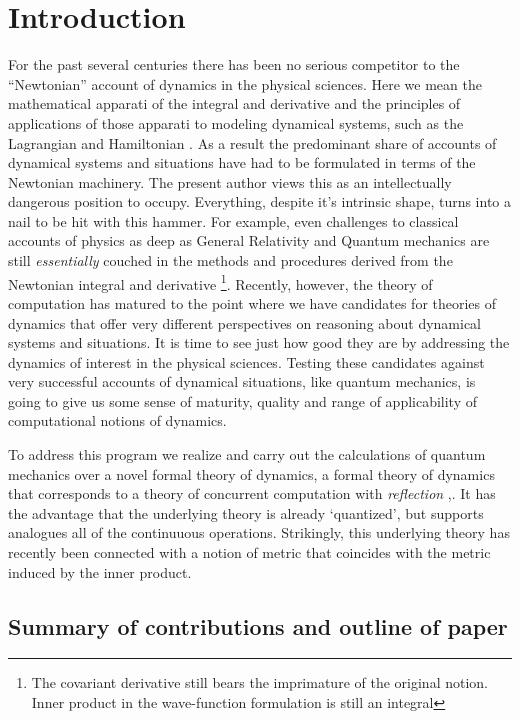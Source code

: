 \section{Introduction}\label{sec:introduction} %
For the past several centuries there has been no serious competitor to
the ``Newtonian'' account of dynamics in the physical sciences. Here
we mean the mathematical apparati of the integral and derivative and
the principles of applications of those apparati to modeling dynamical
systems, such as the Lagrangian and Hamiltonian \cite{375178}. As a
result the predominant share of accounts of dynamical systems and
situations have had to be formulated in terms of the Newtonian
machinery. The present author views this as an intellectually
dangerous position to occupy. Everything, despite it's intrinsic
shape, turns into a nail to be hit with this hammer. For example, even
challenges to classical accounts of physics as deep as General
Relativity \cite{Gravitation} and Quantum mechanics \cite{Dirac1930}
are still \emph{essentially} couched in the methods and procedures
derived from the Newtonian integral and derivative \footnote{The
  covariant derivative still bears the imprimature of the original
  notion. Inner product in the wave-function formulation is still an
  integral}. Recently, however, the theory of computation has matured
to the point where we have candidates for theories of dynamics that
offer very different perspectives on reasoning about dynamical systems
and situations. It is time to see just how good they are by addressing
the dynamics of interest in the physical sciences. Testing these
candidates against very successful accounts of dynamical situations,
like quantum mechanics, is going to give us some sense of maturity,
quality and range of applicability of computational notions of
dynamics.

To address this program we realize and carry out the calculations of
quantum mechanics over a novel formal theory of dynamics, a formal
theory of dynamics that corresponds to a theory of concurrent
computation with \emph{reflection}
\cite{bcsmith:phdthesis},\cite{319871}. It has the advantage that the
underlying theory is already `quantized', but supports analogues all
of the continuuous operations. Strikingly, this underlying theory has
recently been connected with a notion of metric
\cite{DBLP:conf/fossacs/BreugelMOW03} that coincides with the metric
induced by the inner product.

\subsection{Summary of contributions and outline of paper}

